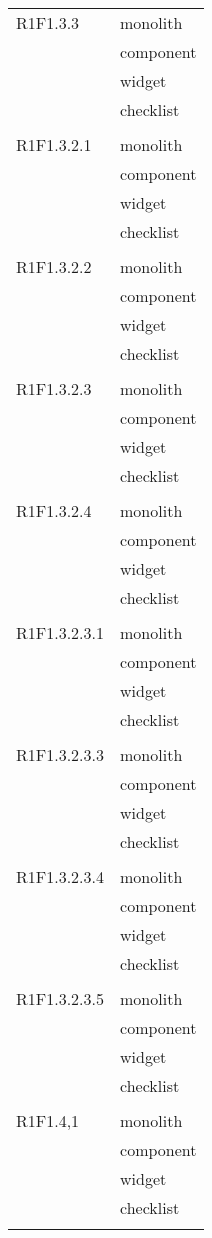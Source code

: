 \begin{center}
\begin{longtable}{|p{7cm}|p{5cm}|}
		R1F1.3.3 & monolith \\ & component \\ & widget \\ & checklist \\ & \\ \hline
		R1F1.3.2.1 & monolith \\ & component \\ & widget \\ & checklist \\ & \\ \hline
		R1F1.3.2.2 & monolith \\ & component \\ & widget \\ & checklist \\ & \\ \hline
		R1F1.3.2.3 & monolith \\ & component \\ & widget \\ & checklist \\ & \\ \hline
		R1F1.3.2.4 & monolith \\ & component \\ & widget \\ & checklist \\ & \\ \hline
		R1F1.3.2.3.1 & monolith \\ & component \\ & widget \\ & checklist \\ & \\ \hline
		R1F1.3.2.3.3 & monolith \\ & component \\ & widget \\ & checklist \\ & \\ \hline
		R1F1.3.2.3.4 & monolith \\ & component \\ & widget \\ & checklist \\ & \\ \hline
		R1F1.3.2.3.5 & monolith \\ & component \\ & widget \\ & checklist \\ & \\ \hline
		R1F1.4,1 & monolith \\ & component \\ & widget \\ & checklist \\ & \\ \hline

\end{longtable}
\end{center}
